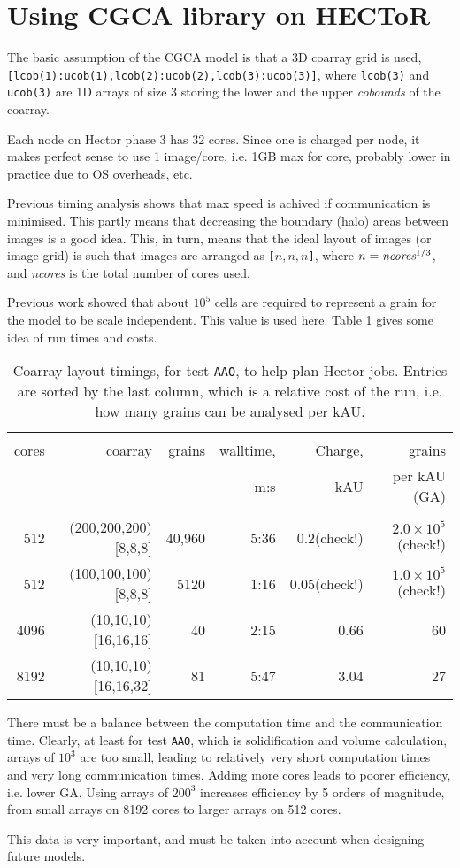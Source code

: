 \section{Using CGCA library on HECToR}

The basic assumption of the CGCA model
is that a 3D coarray grid is used,
\texttt{[lcob(1):ucob(1),lcob(2):ucob(2),lcob(3):ucob(3)]},
where \texttt{lcob(3)} and \texttt{ucob(3)} are
1D arrays of size 3 storing the lower and the upper
{\em cobounds} of the coarray.

Each node on Hector phase 3 has 32 cores.
Since one is charged per node, it makes
perfect sense to use 1 image/core,
i.e. 1GB max for core, probably lower in
practice due to OS overheads, etc.

Previous timing analysis shows that max
speed is achived if communication is
minimised.
This partly means that decreasing the
boundary (halo) areas between images
is a good idea.
This, in turn, means that the ideal
layout of images (or image grid) is
such that images are arranged
as \texttt{[$n,n,n$]}, where $n=\textrm{\em ncores}^{1/3}$,
and {\em ncores} is the total number of cores used.

Previous work \cite{phillips2012} showed that
about $10^5$ cells are required to represent
a grain for the model to be scale independent.
This value is used here.
Table \ref{tab:hector1}  gives some idea of run times
and costs.

\begin{table}[h]
\centering
\begin{tabular}{rrrrrr}
\hline
\\
cores	&coarray	&grains	&walltime,	&Charge,	&grains \\
	&		&	&m:s		&kAU		&per kAU (GA) \\
\hline
\\
512	&(200,200,200)[8,8,8]	&40,960	&5:36	&0.2(check!)	&$2.0 \times 10^5$ (check!) \\
512	&(100,100,100)[8,8,8]	&5120	&1:16	&0.05(check!)	&$1.0 \times 10^5$(check!) \\
4096	&(10,10,10)[16,16,16]	&40	&2:15	&0.66		&60 \\
8192	&(10,10,10)[16,16,32]	&81	&5:47	&3.04		&27 \\
\hline
\end{tabular}
\caption{Coarray layout timings, for test \texttt{AAO},
to help plan Hector jobs.
Entries are sorted by the last column, which is a
relative cost of the run, i.e. how many grains can
be analysed per kAU.}
\label{tab:hector1}
\end{table}

There must be a balance between the computation
time and the communication time.
Clearly, at least for test \texttt{AAO},
which is solidification and volume calculation,
arrays of $10^3$ are too small, leading to
relatively very short computation times
and very long communication times.
Adding more cores leads to poorer efficiency,
i.e. lower GA.
Using arrays of $200^3$ increases efficiency by 5 orders
of magnitude, from small arrays on 8192 cores
to larger arrays on 512 cores.

This data is very important,
and must be taken into account when designing future models.
